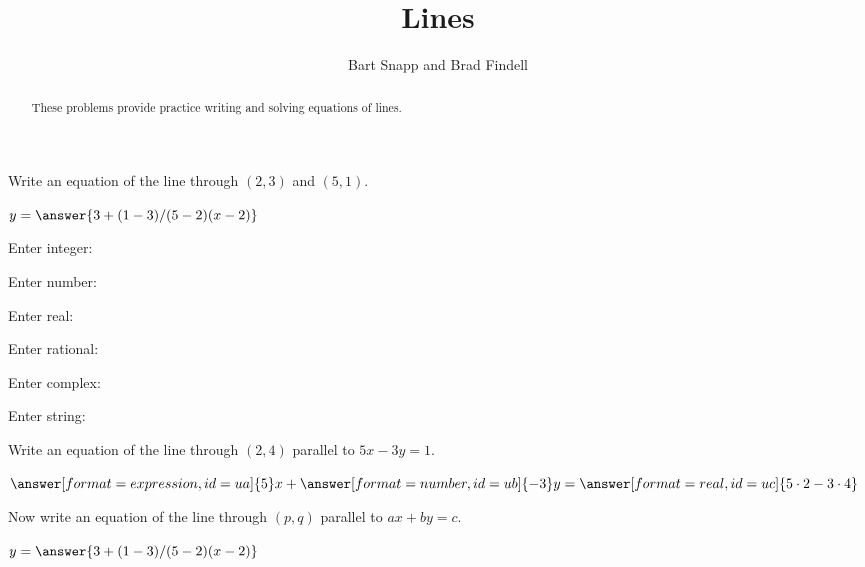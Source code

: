 \documentclass[nooutcomes]{ximera}
\title{Lines}
\author{Bart Snapp and Brad Findell}
\begin{document}
\begin{abstract}
These problems provide practice writing and solving equations of lines. 
\end{abstract}
\maketitle

\begin{problem}
Write an equation of the line through $(2,3)$ and $(5,1)$.  

\begin{prompt}
$y = \answer{3+(1-3)/(5-2)(x-2)}$

Enter integer: 

Enter number: 

Enter real: 

Enter rational: 

Enter complex: 

Enter string: 
\end{prompt}
\end{problem}


\begin{problem}
Write an equation of the line through $(2,4)$ parallel to $5x-3y=1$.  

  \begin{prompt}
    \begin{validator}[(-3*ua==5*ub) && (-3*uc==(5*2-3*4)*ub) && (ub != 0)]
      \(
         \answer[format=expression,id=ua]{5}x + \answer[format=number,id=ub]{-3}y = 
         \answer[format=real,id=uc]{5\cdot2-3\cdot4}
      \)
    \end{validator}
  \end{prompt}
\end{problem}



\begin{problem}
Now write an equation of the line through $(p,q)$ parallel to $ax+by=c$. 

\begin{prompt}
$y = \answer{3+(1-3)/(5-2)(x-2)}$
\end{prompt}
\end{problem}
\end{document}
